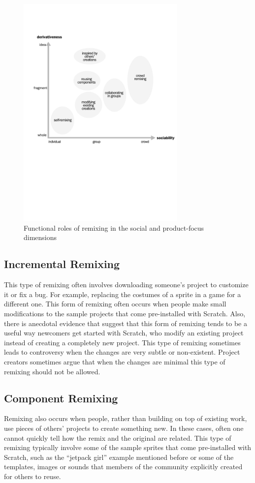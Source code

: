 \begin{figure}
\centering
\includegraphics[width=3.25in]{figures/function.pdf}
\caption{Functional roles of remixing in the social and product-focus dimensions}
\label{fig:function}
\end{figure}

\subsection{Incremental Remixing}
This type of remixing often involves downloading someone's project to customize it or fix a bug. 
For example, replacing the costumes of a sprite in a game for a different one. 
This form of remixing often occurs when people make small modifications to the sample projects that come pre-installed with Scratch.
Also, there is anecdotal evidence that suggest that this form of remixing tends to be a useful way newcomers get started with Scratch, who modify an existing project instead of creating a completely new project.
This type of remixing sometimes leads to controversy when the changes are very subtle or non-existent.
Project creators sometimes argue that when the changes are minimal this type of remixing should not be allowed.

\subsection{Component Remixing}
Remixing also occurs when people, rather than building on top of existing work, use pieces of others' projects to create something new. 
In these cases, often one cannot quickly tell how the remix and the original are related.
This type of remixing typically involve some of the sample sprites that come pre-installed with Scratch, such as the ``jetpack girl'' example mentioned before or some of the templates, images or sounds that members of the community explicitly created for others to reuse.



